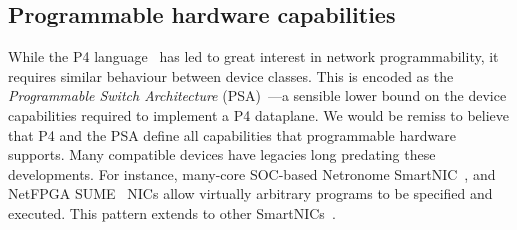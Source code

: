 \documentclass[sigconf,natbib=false]{acmart}
\begin{document}
\subsection{Programmable hardware capabilities}



While the P4 language~\parencite{DBLP:journals/ccr/BosshartDGIMRSTVVW14} has led to great interest in network programmability, it requires similar behaviour between device classes.
This is encoded as the \emph{Programmable Switch Architecture} (PSA)~\parencite{p4-psa}---a sensible lower bound on the device capabilities required to implement a P4 dataplane.
We would be remiss to believe that P4 and the PSA define all capabilities that programmable hardware supports.
Many compatible devices have legacies long predating these developments. 
For instance, many-core SOC-based Netronome SmartNIC~\parencite{netronome-smartnic}, and NetFPGA SUME~\parencite{DBLP:journals/micro/ZilbermanACM14,DBLP:conf/fpga/IbanezBMZ19} NICs allow virtually arbitrary programs to be specified and executed.
This pattern extends to other SmartNICs~\parencite{nvidia-bluefield,xilinx-alveo}.
\end{document}
